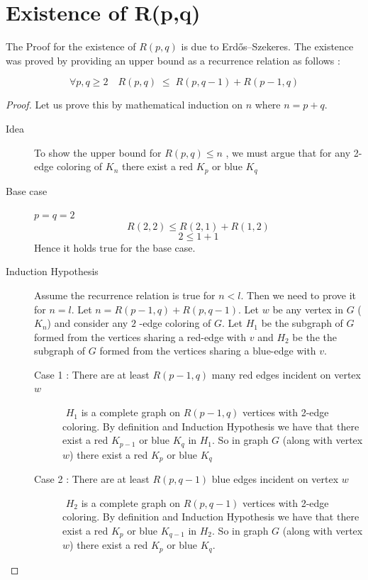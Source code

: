 \section{Existence of R(p,q)}
The Proof for the existence of $R(p,q)$ is due to Erdős–Szekeres. The existence was proved by providing an upper bound as a recurrence relation as follows :
\begin{theorem}
$$\forall p,q \geq 2 \quad R(p,q) \; \leq \; R(p,q-1) + R(p-1,q) $$
\end{theorem}
\begin{proof}
 Let us prove this by mathematical induction on $n$ where $n=p+q$.
 \begin{description}
    \item[Idea] To show the upper bound for $R(p,q) \leq n$ , we must argue that for any 2-edge coloring of $K_n$ there exist a red $K_p$ or blue $K_q$

   \item[Base case] $p=q=2$
$$R(2,2) \leq  R(2,1) + R(1,2)  $$
$$2 \leq 1+1$$
Hence it holds true for the base case.
   \item[Induction Hypothesis]
Assume the recurrence relation is true for $n<l$. Then we need to prove it for $n=l$. Let $n=R(p-1,q)+R(p,q-1)$. Let $w$ be any vertex in $G$ ($K_n$) and consider any $2$ -edge coloring of $G$. Let $H_1$ be the subgraph of $G$ formed from the vertices sharing a red-edge with $v$ and $H_2$ be the the subgraph of $G$ formed from the vertices sharing a blue-edge with $v$.
\begin{description}
   \item[Case 1 : There are at least $R(p-1,q)$ many red edges incident on vertex $w$]
   $ $ \newline
   $H_1$ is a complete graph on $R(p-1,q)$ vertices with 2-edge coloring. By definition and Induction Hypothesis we have that there exist a red $K_{p-1}$ or blue $K_q$ in $H_1$. So in graph $G$ (along with vertex $w$) there exist a red $K_p$ or blue $K_q$
   \item[Case 2 : There are at least $R(p,q-1)$ blue edges incident on vertex $w$]
      $ $ \newline
      $H_2$ is a complete graph on $R(p,q-1)$ vertices with 2-edge coloring. By definition and Induction Hypothesis we have that there exist a red $K_p$ or blue  $K_{q-1}$ in $H_2$. So in graph $G$ (along with vertex $w$) there exist a red $K_p$ or blue $K_q$.
\end{description}
   \end{description}
   
\end{proof} 
   
